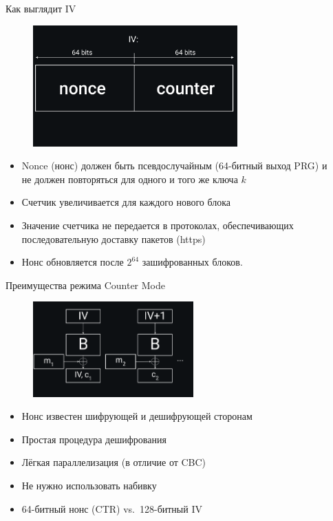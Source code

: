\documentclass[usenames,dvipsnames,8pt,aspectratio=169]{beamer}
\begin{document}
\begin{frame}{Как выглядит IV}
\begin{figure}
\includegraphics[width=0.70\textwidth]{ShapeOfIV}
\end{figure}
\vspace*{-50pt}
\large
\begin{itemize}
\item Nonce (нонс) должен быть псевдослучайным (64-битный выход PRG) и \\ не должен повторяться для одного и того же ключа $k$\\
\item Счетчик увеличивается для каждого нового блока
\item Значение счетчика не передается в протоколах, обеспечивающих \\ последовательную доставку пакетов (https)
\item Нонс обновляется после $2^{64}$ зашифрованных блоков.

\end{itemize}
\end{frame}


\begin{frame}{Преимущества режима Counter Mode}
\begin{figure}
\includegraphics[width=0.55\textwidth]{CTR}
\end{figure}
\vspace{-20pt}
\Large
\begin{itemize}
\item Нонс известен шифрующей и дешифрующей сторонам
\item Простая процедура дешифрования
\item Лёгкая параллелизация (в отличие от CBC)
\item Не нужно использовать набивку
\item 64-битный нонс (CTR) vs.\ 128-битный IV
\end{itemize}

\end{frame}
\end{document}
